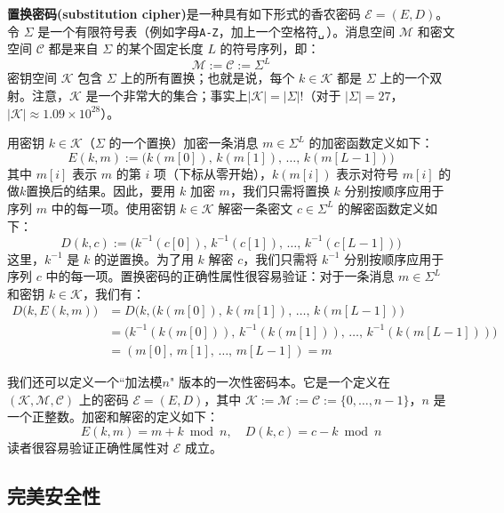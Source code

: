 \begin{example}\label{exmp:2-3}
\textbf{置换密码(substitution cipher)}是一种具有如下形式的香农密码 $\mathcal{E}=(E,D)$。令 $\Sigma$ 是一个有限符号表（例如字母\texttt{A-Z}，加上一个空格符\texttt{␣}\,）。消息空间 $\mathcal{M}$ 和密文空间 $\mathcal{C}$ 都是来自 $\Sigma$ 的某个固定长度 $L$ 的符号序列，即：
\[
\mathcal{M}:=\mathcal{C}:=\Sigma^L
\]
密钥空间 $\mathcal{K}$ 包含 $\Sigma$ 上的所有置换；也就是说，每个 $k\in\mathcal{K}$ 都是 $\Sigma$ 上的一个双射。注意，$\mathcal{K}$ 是一个非常大的集合；事实上$|\mathcal{K}|=|\Sigma|!$（对于 $|\Sigma|=27$，$|\mathcal{K}|\approx 1.09\times10^{28}$）。

用密钥 $k\in\mathcal{K}$（$\Sigma$ 的一个置换）加密一条消息 $m\in\Sigma^L$ 的加密函数定义如下：
\[
E(k,m):=\big(k(m[0]),\,k(m[1]),\,\dots,\,k(m[L-1])\big)
\]
其中 $m[i]$ 表示 $m$ 的第 $i$ 项（下标从零开始），$k(m[i])$ 表示对符号 $m[i]$ 的做$k$置换后的结果。因此，要用 $k$ 加密 $m$，我们只需将置换 $k$ 分别按顺序应用于序列 $m$ 中的每一项。使用密钥 $k\in\mathcal{K}$ 解密一条密文 $c\in\Sigma^L$ 的解密函数定义如下：
\[
D(k,c):=\big(k^{-1}(c[0]),\,k^{-1}(c[1]),\,\dots,\,k^{-1}(c[L-1])\big)
\]
这里，$k^{-1}$ 是 $k$ 的逆置换。为了用 $k$ 解密 $c$，我们只需将 $k^{-1}$ 分别按顺序应用于序列 $c$ 中的每一项。置换密码的正确性属性很容易验证：对于一条消息 $m\in\Sigma^L$ 和密钥 $k\in\mathcal{K}$，我们有：
\[
\begin{aligned}
D\big(k,E(k,m)\big)
&=D\big(k,(k(m[0]),\,k(m[1]),\,\dots,\,k(m[L−1])\big)\\
&=\big(k^{−1}(k(m[0])),\,k^{−1}(k(m[1])),\,\dots,\,k^{−1}(k(m[L−1]))\big)\\
& =(m[0],\,m[1],\,\dots,\,m[L−1])=m
\end{aligned}
\]
\end{example}

\begin{example}[加性一次性密码本]\label{exmp:2-4}
我们还可以定义一个``加法模$n$" 版本的一次性密码本。它是一个定义在 $(\mathcal{K},\mathcal{M},\mathcal{C})$ 上的密码 $\mathcal{E}=(E,D)$，其中 $\mathcal{K}:=\mathcal{M}:=\mathcal{C}:=\{0,\dots,n-1\}$，$n$ 是一个正整数。加密和解密的定义如下：
\[
E(k,m)=m+k \bmod n,
\quad
D(k,c)=c-k \bmod n
\]
读者很容易验证正确性属性对 $\mathcal{E}$ 成立。
\end{example}

\subsection{完美安全性}

